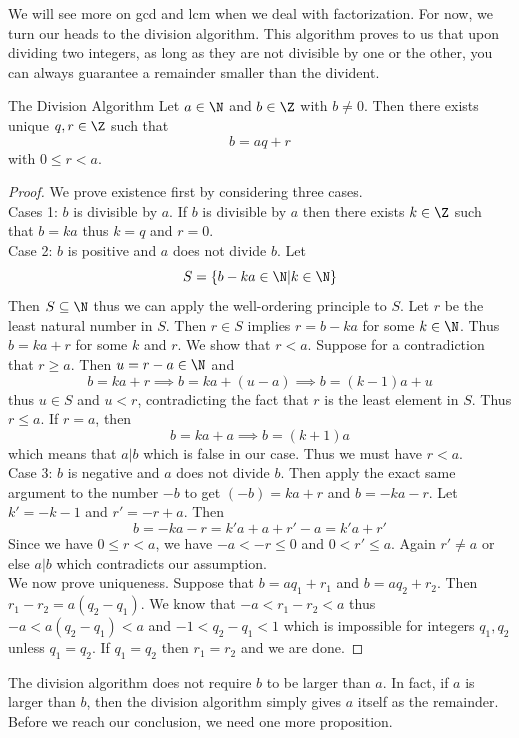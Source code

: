 \documentclass[a4paper]{article}
\begin{document}
We will see more on gcd and lcm when we deal with factorization. For now, we turn our heads to the division algorithm. This algorithm proves to us that upon dividing two integers, as long as they are not divisible by one or the other, you can always guarantee a remainder smaller than the divident. 

\begin{thm}{The Division Algorithm}{} Let $a\in\N$ and $b\in\Z$ with $b\neq 0$. Then there exists unique $q,r\in\Z$ such that $$b=aq+r$$ with $0\leq r<a$. 
\begin{proof}
We prove existence first by considering three cases. \\
Cases 1: $b$ is divisible by $a$.  If $b$ is divisible by $a$ then there exists $k\in\Z$ such that $b=ka$ thus $k=q$ and $r=0$. \\
Case 2: $b$ is positive and $a$ does not divide $b$. Let $$S=\{b-ka\in\N|k\in\N\}$$ Then $S\subseteq\N$ thus we can apply the well-ordering principle to $S$. Let $r$ be the least natural number in $S$. Then $r\in S$ implies $r=b-ka$ for some $k\in\N$. Thus $b=ka+r$ for some $k$ and $r$. We show that $r<a$. Suppose for a contradiction that $r\geq a$. Then $u=r-a\in\N$ and $$b=ka+r\implies b=ka+(u-a)\implies b=(k-1)a+u$$ thus $u\in S$ and $u<r$, contradicting the fact that $r$ is the least element in $S$. Thus $r\leq a$. If $r=a$, then $$b=ka+a\implies b=(k+1)a$$ which means that $a|b$ which is false in our case. Thus we must have $r<a$. \\
Case 3: $b$ is negative and $a$ does not divide $b$. Then apply the exact same argument to the number $-b$ to get $(-b)=ka+r$ and $b=-ka-r$. Let $k'=-k-1$ and $r'=-r+a$. Then $$b=-ka-r=k'a+a+r'-a=k'a+r'$$ Since we have $0\leq r<a$, we have $-a<-r\leq 0$ and $0<r'\leq a$. Again $r'\neq a$ or else $a|b$ which contradicts our assumption. \\
We now prove uniqueness. Suppose that $b=aq_1+r_1$ and $b=aq_2+r_2$. Then $r_1-r_2=a(q_2-q_1)$. We know that $-a<r_1-r_2<a$ thus $-a<a(q_2-q_1)<a$ and $-1<q_2-q_1<1$ which is impossible for integers $q_1,q_2$ unless $q_1=q_2$. If $q_1=q_2$ then $r_1=r_2$ and we are done. 
\end{proof}
\end{thm}

The division algorithm does not require $b$ to be larger than $a$. In fact, if $a$ is larger than $b$, then the division algorithm simply gives $a$ itself as the remainder. Before we reach our conclusion, we need one more proposition. 
\end{document}

